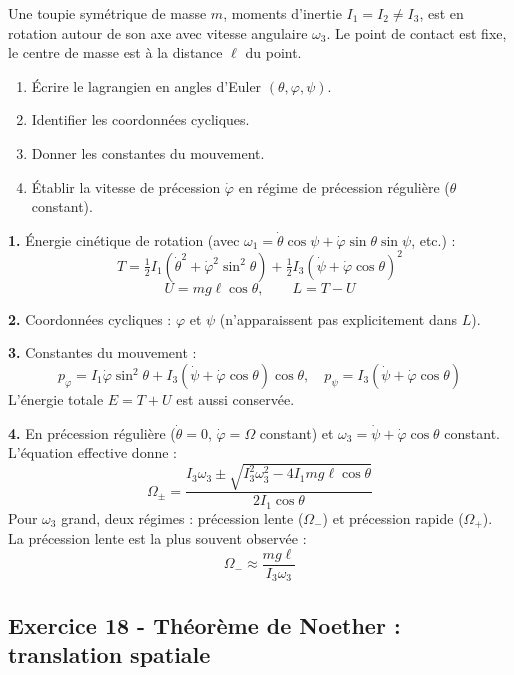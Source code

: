 \documentclass[12pt,a4paper]{article}
\begin{document}
\begin{boiteexercice}
Une toupie symétrique de masse $m$, moments d'inertie $I_1 = I_2 \neq I_3$, est en rotation autour de son axe avec vitesse angulaire $\omega_3$. Le point de contact est fixe, le centre de masse est à la distance $\ell$ du point.
\begin{enumerate}
  \item Écrire le lagrangien en angles d'Euler $(\theta, \varphi, \psi)$.
  \item Identifier les coordonnées cycliques.
  \item Donner les constantes du mouvement.
  \item Établir la vitesse de précession $\dot\varphi$ en régime de précession régulière ($\theta$ constant).
\end{enumerate}
\end{boiteexercice}

\begin{boitecorrige}
\textbf{1.} Énergie cinétique de rotation (avec $\omega_1 = \dot\theta\cos\psi + \dot\varphi\sin\theta\sin\psi$, etc.) :
\[
T = \tfrac{1}{2}I_1(\dot\theta^2 + \dot\varphi^2\sin^2\theta) + \tfrac{1}{2}I_3(\dot\psi + \dot\varphi\cos\theta)^2
\]
\[
U = mg\ell\cos\theta, \qquad L = T - U
\]

\textbf{2.} Coordonnées cycliques : $\varphi$ et $\psi$ (n'apparaissent pas explicitement dans $L$).

\textbf{3.} Constantes du mouvement :
\[
p_\varphi = I_1\dot\varphi\sin^2\theta + I_3(\dot\psi + \dot\varphi\cos\theta)\cos\theta, \quad p_\psi = I_3(\dot\psi + \dot\varphi\cos\theta)
\]
L'énergie totale $E = T + U$ est aussi conservée.

\textbf{4.} En précession régulière ($\dot\theta = 0$, $\dot\varphi = \Omega$ constant) et $\omega_3 = \dot\psi + \dot\varphi\cos\theta$ constant. L'équation effective donne :
\[
\Omega_\pm = \frac{I_3\omega_3 \pm \sqrt{I_3^2\omega_3^2 - 4I_1 mg\ell\cos\theta}}{2I_1\cos\theta}
\]
Pour $\omega_3$ grand, deux régimes : précession lente ($\Omega_-$) et précession rapide ($\Omega_+$). La précession lente est la plus souvent observée :
\[
\Omega_- \approx \frac{mg\ell}{I_3\omega_3}
\]
\end{boitecorrige}

\subsection*{Exercice 18 - Théorème de Noether : translation spatiale \niveau{\moyen}}
\end{document}
